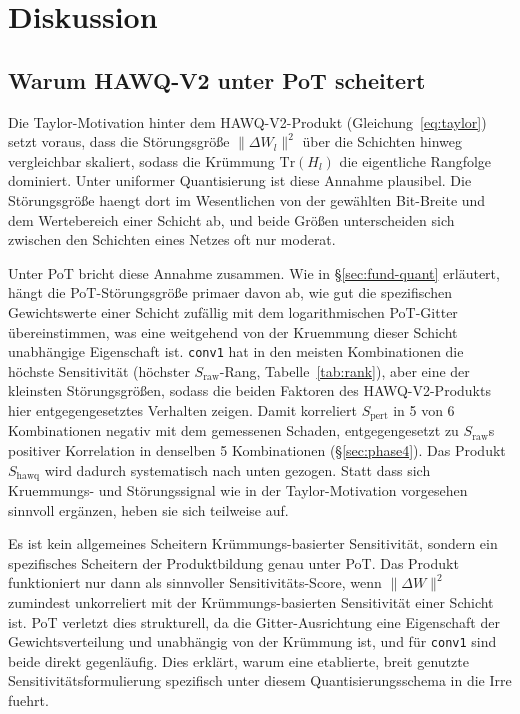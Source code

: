 \section{Diskussion}
\label{sec:discussion}

\subsection{Warum HAWQ-V2 unter PoT scheitert}
\label{sec:disc-hawq}

Die Taylor-Motivation hinter dem HAWQ-V2-Produkt (Gleichung~\eqref{eq:taylor}) setzt voraus, dass die Störungsgröße $\|\Delta W_l\|^2$ über die Schichten hinweg vergleichbar skaliert, sodass die Krümmung $\mathrm{Tr}(H_l)$ die eigentliche Rangfolge dominiert. Unter uniformer Quantisierung ist diese Annahme plausibel. Die Störungsgröße haengt dort im Wesentlichen von der gewählten Bit-Breite und dem Wertebereich einer Schicht ab, und beide Größen unterscheiden sich zwischen den Schichten eines Netzes oft nur moderat.
\par\medskip

Unter PoT bricht diese Annahme zusammen. Wie in \S\ref{sec:fund-quant} erläutert, hängt die PoT-Störungsgröße primaer davon ab, wie gut die spezifischen Gewichtswerte einer Schicht zufällig mit dem logarithmischen PoT-Gitter übereinstimmen, was eine weitgehend von der Kruemmung dieser Schicht unabhängige Eigenschaft ist. \texttt{conv1} hat in den meisten Kombinationen die höchste Sensitivität (höchster $S_{\mathrm{raw}}$-Rang, Tabelle~\ref{tab:rank}), aber eine der kleinsten Störungsgrößen, sodass die beiden Faktoren des HAWQ-V2-Produkts hier entgegengesetztes Verhalten zeigen. Damit korreliert $S_{\mathrm{pert}}$ in 5 von 6 Kombinationen negativ mit dem gemessenen Schaden,  entgegengesetzt zu $S_{\mathrm{raw}}$s positiver Korrelation in denselben 5 Kombinationen (\S\ref{sec:phase4}). Das Produkt $S_{\mathrm{hawq}}$ wird dadurch systematisch nach unten gezogen. Statt dass sich Kruemmungs- und Störungssignal wie in der Taylor-Motivation vorgesehen sinnvoll ergänzen, heben sie sich teilweise auf.
\par\medskip

Es ist kein allgemeines Scheitern Krümmungs-basierter Sensitivität, sondern ein spezifisches Scheitern der Produktbildung genau unter PoT. Das Produkt funktioniert nur dann als sinnvoller Sensitivitäts-Score, wenn $\|\Delta W\|^2$ zumindest unkorreliert mit der Krümmungs-basierten Sensitivität einer Schicht ist. PoT verletzt dies strukturell, da die Gitter-Ausrichtung eine Eigenschaft der Gewichtsverteilung und unabhängig von der Krümmung ist, und für \texttt{conv1} sind beide direkt gegenläufig. Dies erklärt, warum eine etablierte, breit genutzte Sensitivitätsformulierung spezifisch unter diesem Quantisierungsschema in die Irre fuehrt.

